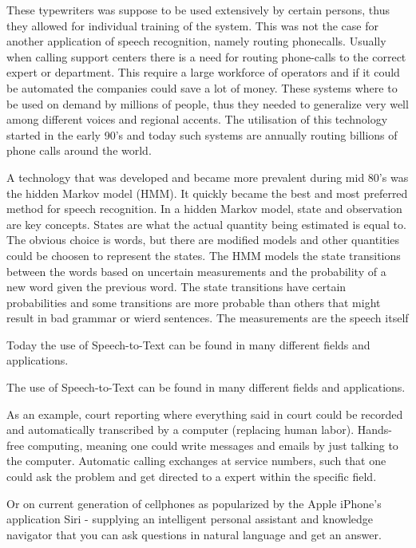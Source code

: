 \documentclass[a4paper,12pt,twoside]{ltxdoc}
\begin{document}
These typewriters was suppose to be used extensively by certain persons, thus they allowed for individual training of the system. This was not the case for another application of speech recognition, namely routing phonecalls. Usually when calling support centers there is a need for routing phone-calls to the correct expert or department. This require a large workforce of operators and if it could be automated the companies could save a lot of money. These systems where to be used on demand by millions of people, thus they needed to generalize very well among different voices and regional accents. The utilisation of this technology started in the early 90's and today such systems are annually routing billions of phone calls around the world. 

A technology that was developed and became more prevalent during mid 80's was the hidden Markov model (HMM). It quickly became the best and most preferred method for speech recognition. In a hidden Markov model, state and observation are key concepts. States are what the actual quantity being estimated is equal to. The obvious choice is words, but there are modified models and other quantities could be choosen to represent the states. The HMM models the state transitions between the words based on uncertain measurements and the probability of a new word given the previous word. The state transitions have certain probabilities and some transitions are more probable than others that might result in bad grammar or wierd sentences.  The measurements are the speech itself 

Today the use of Speech-to-Text can be found in many different fields and applications.

The use of Speech-to-Text can be found in many different fields and applications.


As an example, court reporting where everything said in court could be recorded and automatically transcribed by a computer (replacing human labor).
Hands-free computing, meaning one could write messages and emails by just talking to the computer.
Automatic calling exchanges at service numbers, such that one could ask the problem and get directed to a expert within the specific field.

Or on current generation of cellphones as popularized by the Apple iPhone's application Siri
- supplying an intelligent personal assistant and knowledge navigator that you can ask questions in natural language and get an answer. 

\end{document}
